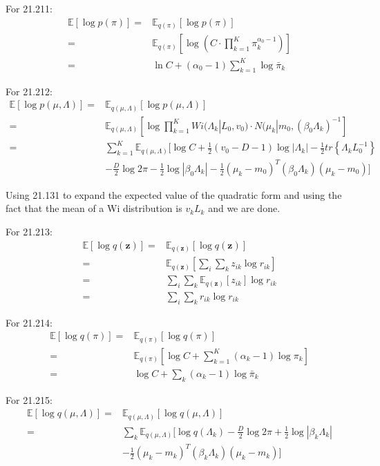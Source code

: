 \documentclass[UTF8]{ctexart}
\begin{document}
For 21.211:
\begin{align}
\mathbb{E}[\log p(\pi)]=&\mathbb{E}_{q(\pi)}[\log p(\pi)] \nonumber \\
=&\mathbb{E}_{q(\pi)}[\log (C\cdot \prod_{k=1}^{K}\pi_{k}^{\alpha_{0}-1})]\nonumber \\
=&\ln C + (\alpha_{0}-1)\sum_{k=1}^{K}\log \bar{\pi}_{k} \nonumber
\end{align}

For 21.212:
\begin{align}
\mathbb{E}[\log p(\mu,\Lambda)]=&\mathbb{E}_{q(\mu,\Lambda)}[\log p(\mu,\Lambda)] \nonumber \\
=&\mathbb{E}_{q(\mu,\Lambda)}[\log \prod_{k=1}^{K}Wi(\Lambda_{k}|L_{0},v_{0})\cdot N(\mu_{k}|m_{0},(\beta_{0}\Lambda_{k})^{-1}]\nonumber \\
=&\sum_{k=1}^{K}\mathbb{E}_{q(\mu,\Lambda)}[ \log C + \frac{1}{2}(v_{0}-D-1)\log |\Lambda_{k}| -\frac{1}{2}tr\left\{ \Lambda_{k}L_{0}^{-1} \right\}\nonumber \\
\ & - \frac{D}{2}\log 2 \pi - \frac{1}{2}\log |\beta_{0}\Lambda_{k}| -\frac{1}{2}(\mu_{k}-m_{0})^{T}(\beta_{0}\Lambda_{k})(\mu_{k}-m_{0}) ]\nonumber
\end{align}

Using 21.131 to expand the expected value of the quadratic form and using the fact that the mean of a Wi distribution is $v_{k}L_{k}$ and we are done.

For 21.213:
\begin{align}
\mathbb{E}[\log q(\textbf{z})]=& \mathbb{E}_{q(\textbf{z})}[\log q(\textbf{z})] \nonumber \\
=&\mathbb{E}_{q(\textbf{z})}[\sum_{i}\sum_{k}z_{ik}\log r_{ik}]\nonumber \\
=&\sum_{i}\sum_{k} \mathbb{E}_{q(\textbf{z})}[z_{ik}]\log r_{ik}\nonumber \\
=& \sum_{i}\sum_{k} r_{ik}\log r_{ik}\nonumber 
\end{align}

For 21.214:
\begin{align}
\mathbb{E}[\log q(\pi)]=&\mathbb{E}_{q(\pi)}[\log q(\pi)] \nonumber \\
=&\mathbb{E}_{q(\pi)}[\log C + \sum_{k=1}^{K}(\alpha_{k}-1)\log \pi_{k}] \nonumber \\
=&\log C + \sum_{k}(\alpha_{k}-1)\log \bar{\pi}_{k} \nonumber
\end{align}

For 21.215:
\begin{align}
\mathbb{E}[\log q(\mu,\Lambda)]=& \mathbb{E}_{q(\mu,\Lambda)}[\log q(\mu,\Lambda)] \nonumber \\
=&\sum_{k}\mathbb{E}_{q(\mu,\Lambda)}[\log q(\Lambda_{k})-\frac{D}{2}\log 2\pi +\frac{1}{2}\log |\beta_{k}\Lambda_{k}|\nonumber \\
\ &-\frac{1}{2}(\mu_{k}-m_{k})^{T}(\beta_{k}\Lambda_{k})(\mu_{k}-m_{k})  ]\nonumber 
\end{align}
\end{document}
